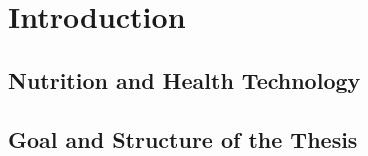 
\chapter{Introduction}\label{chapter:introduction}

\section{Nutrition and Health Technology}
\section{Goal and Structure of the Thesis}
